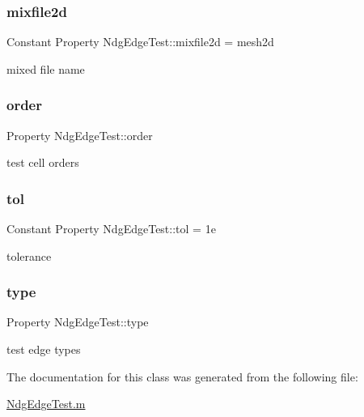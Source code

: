 \mbox{\label{class_ndg_edge_test_a44e8b8faa70b93689f4e8f0a0d80edc6}} 
\subsubsection{\texorpdfstring{mixfile2d}{mixfile2d}}
{\footnotesize\ttfamily Constant Property Ndg\+Edge\+Test\+::mixfile2d = \textquotesingle{}mesh2d}



mixed file name 

\mbox{\label{class_ndg_edge_test_ab3473b927738036503cf905cfceadf5e}} 
\subsubsection{\texorpdfstring{order}{order}}
{\footnotesize\ttfamily Property Ndg\+Edge\+Test\+::order}



test cell orders 

\mbox{\label{class_ndg_edge_test_ae5d87d95b3963d7f9810160f7fb89cd3}} 
\subsubsection{\texorpdfstring{tol}{tol}}
{\footnotesize\ttfamily Constant Property Ndg\+Edge\+Test\+::tol = 1e}



tolerance 

\mbox{\label{class_ndg_edge_test_a49d00a052d95265f17f599edb959706c}} 
\subsubsection{\texorpdfstring{type}{type}}
{\footnotesize\ttfamily Property Ndg\+Edge\+Test\+::type}



test edge types 



The documentation for this class was generated from the following file\+:\begin{DoxyCompactItemize}
\item 
\hyperlink{_ndg_edge_test_8m}{Ndg\+Edge\+Test.\+m}\end{DoxyCompactItemize}
